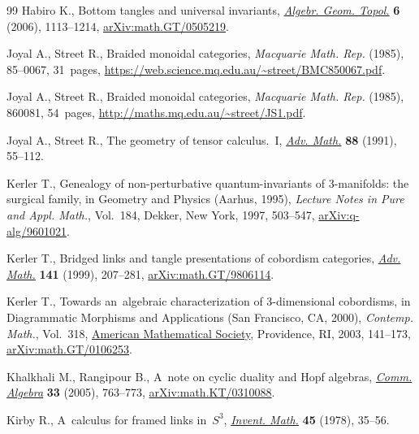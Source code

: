 \documentclass[10pt,a4paper]{amsart}
\numberwithin{equation}{section}
\begin{document}
\begin{thebibliography}{99}
Habiro K., Bottom tangles and universal invariants,
 \href{https://doi.org/10.2140/agt.2006.6.1113}{\textit{Algebr. Geom. Topol.}}
 \textbf{6} (2006), 1113--1214,
 \href{http://arxiv.org/abs/math.GT/0505219}{arXiv:math.GT/0505219}.

Joyal A., Street R., Braided monoidal categories, \textit{Macquarie Math. Rep.}
 (1985), 85--0067, 31~pages,
 \url{https://web.science.mq.edu.au/~street/BMC850067.pdf}.

Joyal A., Street R., Braided monoidal categories, \textit{Macquarie Math. Rep.}
 (1985), 860081, 54~pages, \url{http://maths.mq.edu.au/~street/JS1.pdf}.

Joyal A., Street R., The geometry of tensor calculus.~{I},
 \href{https://doi.org/10.1016/0001-8708(91)90003-P}{\textit{Adv. Math.}}
 \textbf{88} (1991), 55--112.

Kerler T., Genealogy of non-perturbative quantum-invariants of {$3$}-manifolds:
 the surgical family, in Geometry and Physics ({A}arhus, 1995),
 \textit{Lecture Notes in Pure and Appl. Math.}, Vol.~184, Dekker, New York,
 1997, 503--547,
 \href{http://arxiv.org/abs/q-alg/9601021}{arXiv:q-alg/9601021}.

Kerler T., Bridged links and tangle presentations of cobordism categories,
 \href{https://doi.org/10.1006/aima.1998.1772}{\textit{Adv. Math.}}
 \textbf{141} (1999), 207--281,
 \href{http://arxiv.org/abs/math.GT/9806114}{arXiv:math.GT/9806114}.

Kerler T., Towards an~algebraic characterization of 3-dimensional cobordisms,
 in Diagrammatic Morphisms and Applications ({S}an {F}rancisco, {CA}, 2000),
 \textit{Contemp. Math.}, Vol.~318,
 \href{https://doi.org/10.1090/conm/318/05549}{American Mathematical Society},
 Providence, RI, 2003, 141--173,
 \href{http://arxiv.org/abs/math.GT/0106253}{arXiv:math.GT/0106253}.

Khalkhali M., Rangipour B., A~note on cyclic duality and {H}opf algebras,
 \href{https://doi.org/10.1081/AGB-200051130}{\textit{Comm. Algebra}}
 \textbf{33} (2005), 763--773,
 \href{http://arxiv.org/abs/math.KT/0310088}{arXiv:math.KT/0310088}.

Kirby R., A~calculus for framed links in~{$S^{3}$},
 \href{https://doi.org/10.1007/BF01406222}{\textit{Invent. Math.}} \textbf{45}
 (1978), 35--56.


\end{thebibliography}
\end{document}
